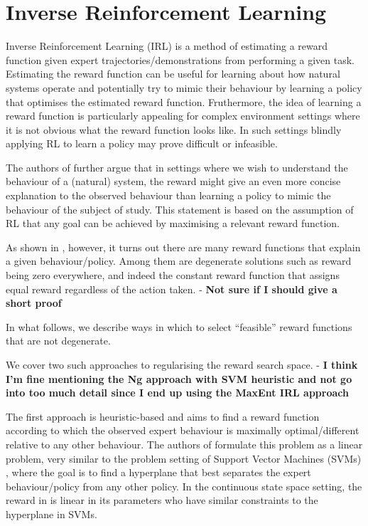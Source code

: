 \documentclass{report}
\numberwithin{equation}{section}
\numberwithin{figure}{section}
\numberwithin{table}{section}
\numberwithin{algorithm}{section}
\begin{document}
\chapter{Inverse Reinforcement Learning}\label{chap:IRL}
Inverse Reinforcement Learning (IRL) is a method of estimating 
a reward function given expert trajectories/demonstrations 
from performing a given task. Estimating the reward function can be 
useful for learning about how natural systems operate and potentially 
try to mimic their behaviour by learning a policy that 
optimises the 
estimated reward function. Fruthermore, the idea of learning a 
reward function 
is particularly appealing for complex environment settings 
where it is not obvious what the reward function looks like. 
In such settings blindly applying RL to learn a policy may 
prove difficult or infeasible. 


The authors of \cite{NgIRL} 
further argue that in settings where we wish to understand 
the behaviour of a (natural) system, the reward might give an even 
more concise explanation to the observed behaviour 
than learning a policy to mimic the behaviour of the subject 
of study. This statement is based on the assumption 
of RL that any goal can be achieved by maximising a relevant reward 
function.

As shown in \cite{NgIRL}, however, it turns out there are many 
reward functions that explain a given behaviour/policy. Among 
them are degenerate solutions such as reward being zero everywhere, 
and indeed the constant reward function that assigns equal reward 
regardless of the action taken. - \textbf{Not sure if I should give a short proof}

In what follows, we describe ways in which to select ``feasible'' 
reward functions that are not degenerate. 

We cover two such approaches to regularising the reward 
search space. - \textbf{I think I'm fine mentioning the Ng 
approach with SVM heuristic and not go into too much detail 
since I end up using the MaxEnt IRL approach}


The first approach is heuristic-based \citep{NgIRL} and 
aims to find 
a reward function according to which the observed expert behaviour 
is maximally optimal/different relative to any other behaviour. The 
authors of \cite{NgIRL} formulate this problem as a linear problem, 
very similar to the problem setting of Support Vector Machines 
(SVMs) \citep{SVMs}, where the goal is to find a hyperplane that 
best separates the expert behaviour/policy from any other policy. 
In the continuous state space setting, the reward in \cite{NgIRL} 
is linear in its parameters who have similar constraints to 
the hyperplane in SVMs.
\end{document}
